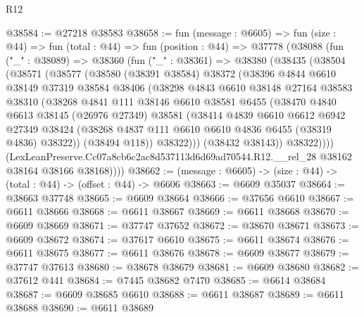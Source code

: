 \begin{lexlean}{R12}
\begin{coremodule}
@38584 := @27218 @38583
@38658 := fun (message : @6605) =>
  fun (size : @44) =>
  fun (total : @44) =>
  fun (position : @44) =>
  @37778
    (@38088
      (fun ("_" : @38089) =>
      @38360
        (fun ("_" : @38361) =>
        @38380
          (@38435
            (@38504
              (@38571
                (@38577
                  (@38580
                    (@38391 @38584)
                    @38372
                    (@38396
                      @4844
                      @6610
                      @38149
                      @37319
                      @38584
                      @38406
                      (@38298
                        @4843
                        @6610
                        @38148
                        @27164
                        @38583
                        @38310
                        (@38268
                          @4841
                          @111
                          @38146
                          @6610
                          @38581
                          @6455
                          (@38470
                            @4840
                            @6613
                            @38145
                            (@26976 @27349)
                            @38581
                            (@38414
                              @4839
                              @6610
                              @6612
                              @6942
                              @27349
                              @38424
                              (@38268 @4837 @111 @6610 @6610 @4836 @6455 (@38319 @4836) @38322))
                            (@38494 @118))
                          @38322)))
                    (@38432 @38143))
                  @38322))))
          (LexLeanPreserve.Cc07a8cb6c2ac8d537113d6d69ad70544.R12.__rel_28
            @38162
            @38164
            @38166
            @38168))))
@38662 := (message : @6605) -> (size : @44) -> (total : @44) -> (offset : @44) -> @6606
@38663 := @6609 @35037
@38664 := @38663 @37748
@38665 := @6609 @38664
@38666 := @37656 @6610
@38667 := @6611 @38666
@38668 := @6611 @38667
@38669 := @6611 @38668
@38670 := @6609 @38669
@38671 := @37747 @37652
@38672 := @38670 @38671
@38673 := @6609 @38672
@38674 := @37617 @6610
@38675 := @6611 @38674
@38676 := @6611 @38675
@38677 := @6611 @38676
@38678 := @6609 @38677
@38679 := @37747 @37613
@38680 := @38678 @38679
@38681 := @6609 @38680
@38682 := @37612 @441
@38684 := @7445 @38682 @7470
@38685 := @6614 @38684
@38687 := @6609 @38685 @6610
@38688 := @6611 @38687
@38689 := @6611 @38688
@38690 := @6611 @38689

\end{coremodule}
\end{lexlean}
